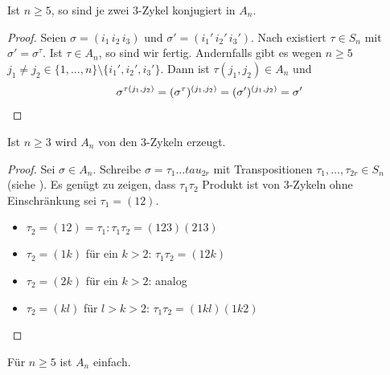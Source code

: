 \begin{lemma}
	Ist $n \geq 5$, so sind je zwei $3$-Zykel konjugiert in $A_n$.
\end{lemma}
\begin{proof}
	Seien $\sigma=(i_1\, i_2\, i_3)$ und $\sigma'=(i_1'\, i_2'\, i_3')$. Nach  existiert $\tau\in S_n$ mit $\sigma'=\sigma^\tau$. Ist $\tau\in A_n$, so sind wir fertig. Andernfalls gibt es wegen $n\ge 5$ $j_1\neq j_2\in\{1,...,n\}\setminus \{i_1',i_2',i_3'\}$. Dann ist $\tau(j_1,j_2)\in A_n$ und
	\begin{align}
		\sigma^{\tau(j_1,j_2)} = (\sigma^\tau)^{(j_1,j_2)} = (\sigma')^{(j_1,j_2)} = \sigma'\notag
	\end{align}
\end{proof}

\begin{lemma}
	Ist $n\geq 3$ wird $A_n$ von den $3$-Zykeln erzeugt.
\end{lemma}

\begin{proof}
	Sei $\sigma \in A_n$. Schreibe $\sigma=\tau_1 \dots tau_{2r}$ mit Transpositionen $\tau_1,\dots,\tau_{2r} \in S_n$ (siehe ). Es genügt zu zeigen, dass $\tau_1\tau_2$ Produkt ist von $3$-Zykeln ohne Einschränkung sei $\tau_1=(12)$.
	\begin{itemize}
		\item $\tau_2 = (12) = \tau_1\colon \tau_1\tau_2 = (123)(213)$
		\item $\tau_2= (1k)$ für ein $k>2$: $\tau_1\tau_2 = (12k)$
		\item $\tau_2= (2k)$ für ein $k>2$: analog
		\item $\tau_2= (kl)$ für $l>k>2$: $\tau_1\tau_2 = (1kl)(1k2)$
	\end{itemize}
\end{proof}

\begin{theorem}
	Für $n\geq 5$ ist $A_n$ einfach.
\end{theorem}

